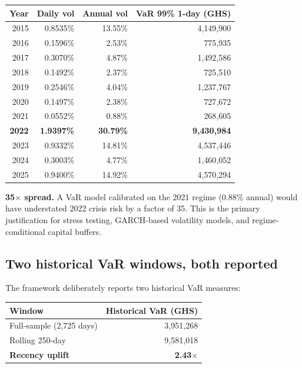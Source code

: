 \documentclass[11pt,a4paper]{article}
\begin{document}
\begin{table}[h!]
\centering
\renewcommand{\arraystretch}{1.2}
\begin{tabular}{r r r r}
\toprule
\textbf{Year} & \textbf{Daily vol} & \textbf{Annual vol} & \textbf{VaR 99\% 1-day (GHS)} \\
\midrule
2015 & 0.8535\% & 13.55\% & 4{,}149{,}900 \\
2016 & 0.1596\% &  2.53\% &   775{,}935 \\
2017 & 0.3070\% &  4.87\% & 1{,}492{,}586 \\
2018 & 0.1492\% &  2.37\% &   725{,}510 \\
2019 & 0.2546\% &  4.04\% & 1{,}237{,}767 \\
2020 & 0.1497\% &  2.38\% &   727{,}672 \\
2021 & 0.0552\% &  0.88\% &   268{,}605 \\
\textbf{2022} & \textbf{1.9397\%} & \textbf{30.79\%} & \textbf{9{,}430{,}984} \\
2023 & 0.9332\% & 14.81\% & 4{,}537{,}446 \\
2024 & 0.3003\% &  4.77\% & 1{,}460{,}052 \\
2025 & 0.9400\% & 14.92\% & 4{,}570{,}294 \\
\bottomrule
\end{tabular}
\end{table}

\noindent\textbf{35\(\times\) spread.} A VaR model calibrated on the
2021 regime (0.88\% annual) would have understated 2022 crisis risk by
a factor of 35. This is the primary justification for stress testing,
GARCH-based volatility models, and regime-conditional capital buffers.

\subsection{Two historical VaR windows, both reported}

The framework deliberately reports two historical VaR measures:

\begin{table}[h!]
\centering
\renewcommand{\arraystretch}{1.3}
\begin{tabular}{L{6cm} r}
\toprule
\textbf{Window} & \textbf{Historical VaR (GHS)} \\
\midrule
Full-sample (2{,}725 days)  & 3{,}951{,}268 \\
Rolling 250-day             & 9{,}581{,}018 \\
\midrule
\textbf{Recency uplift}     & \textbf{2.43\(\times\)} \\
\bottomrule
\end{tabular}
\end{table}
\end{document}
